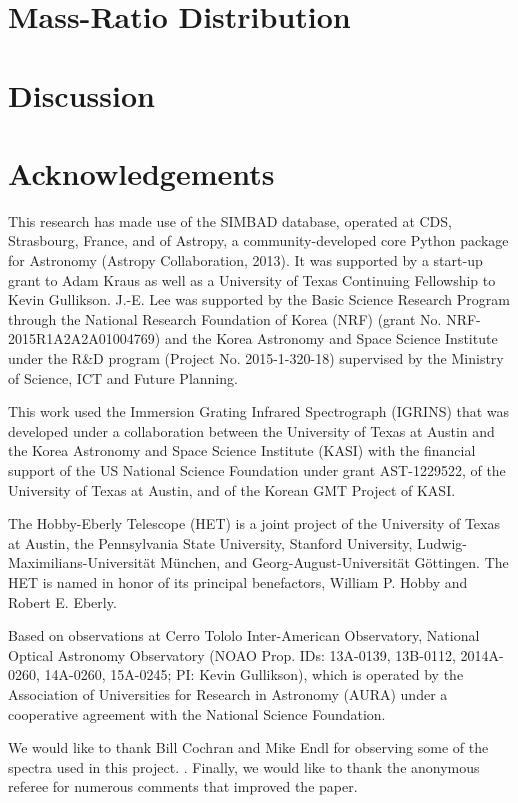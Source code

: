 \documentclass{emulateapj}
\begin{document}
\section{Mass-Ratio Distribution}
\label{sec:mrd}

\section{Discussion}
\label{sec:discussion}


\section*{Acknowledgements}
This research has made use of the SIMBAD database, operated at CDS, Strasbourg, France, and of Astropy, a community-developed core Python package for Astronomy (Astropy Collaboration, 2013).
It was supported by a start-up grant to Adam Kraus as well as a University of Texas Continuing Fellowship to Kevin Gullikson. J.-E. Lee was supported by the Basic Science Research Program through the National Research Foundation of Korea (NRF) (grant No. NRF-2015R1A2A2A01004769) and the Korea
Astronomy and Space Science Institute under the R\&D program (Project No. 2015-1-320-18) supervised by the Ministry of Science, ICT and Future Planning.

This work used the Immersion Grating Infrared Spectrograph (IGRINS) that was developed under a collaboration between the University of Texas at Austin and the Korea Astronomy and Space Science Institute (KASI) with the financial support of the US National Science Foundation under grant AST-1229522, of the University of Texas at Austin, and of the Korean GMT Project of KASI.

The Hobby-Eberly Telescope (HET) is a joint project of the University of Texas at Austin, the Pennsylvania State University, Stanford University, Ludwig-Maximilians-Universit\"at M\"unchen, and Georg-August-Universit\"at G\"ottingen. The HET is named in honor of its principal benefactors, William P. Hobby and Robert E. Eberly.

Based on observations at Cerro Tololo Inter-American Observatory, National Optical Astronomy Observatory (NOAO Prop. IDs: 13A-0139, 13B-0112, 2014A-0260, 14A-0260, 15A-0245; PI: Kevin Gullikson), which is operated by the Association of Universities for Research in Astronomy (AURA) under a cooperative agreement with the National Science Foundation. 

We would like to thank Bill Cochran and Mike Endl for observing some of the spectra used in this project. . Finally, we would like to thank the anonymous referee for numerous comments that improved the paper.
\end{document}

